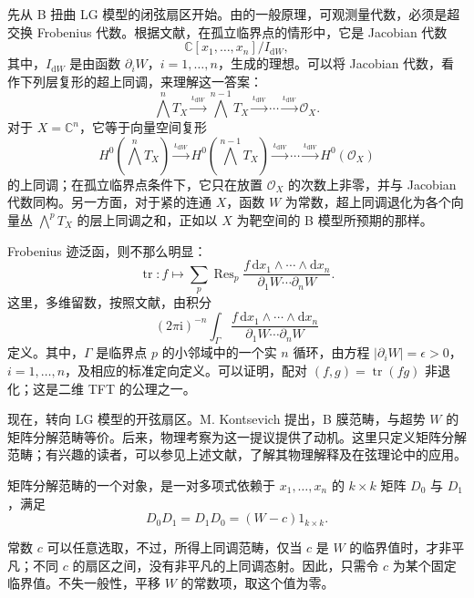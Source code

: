 先从 B 扭曲 LG 模型的闭弦扇区开始。由的一般原理，可观测量代数，必须是超交换 Frobenius 代数。根据文献，在孤立临界点的情形中，它是 Jacobian 代数
\[
\mathbb{C}[x_1,\ldots,x_n]/I_{\mathrm{d}W},
\]
其中，$I_{\mathrm{d}W}$ 是由函数 $\partial_iW$，$i=1,\ldots,n$，生成的理想。可以将 Jacobian 代数，看作下列层复形的超上同调，来理解这一答案：
\[
\bigwedge^nT_X\xrightarrow{\iota_{\mathrm{d}W}}
\bigwedge^{n-1}T_X\xrightarrow{\iota_{\mathrm{d}W}}
\cdots\xrightarrow{\iota_{\mathrm{d}W}}\mathcal{O}_X.
\]
对于 $X=\mathbb{C}^n$，它等于向量空间复形
\[
H^0(\textstyle\bigwedge^nT_X)\xrightarrow{\iota_{\mathrm{d}W}}
H^0(\textstyle\bigwedge^{n-1}T_X)\xrightarrow{\iota_{\mathrm{d}W}}
\cdots\xrightarrow{\iota_{\mathrm{d}W}}H^0(\mathcal{O}_X)
\]
的上同调；在孤立临界点条件下，它只在放置 $\mathcal{O}_X$ 的次数上非零，并与 Jacobian 代数同构。另一方面，对于紧的连通 $X$，函数 $W$ 为常数，超上同调退化为各个向量丛 $\bigwedge^pT_X$ 的层上同调之和，正如以 $X$ 为靶空间的 B 模型所预期的那样。

Frobenius 迹泛函，则不那么明显：
\[
\operatorname{tr}\colon f\longmapsto
\sum_p\operatorname{Res}_p
\frac{f\,\mathrm{d}x_1\wedge\cdots\wedge\mathrm{d}x_n}
{\partial_1W\cdots\partial_nW}.
\]
这里，多维留数，按照文献，由积分
\[
(2\pi\mathrm{i})^{-n}\int_\Gamma
\frac{f\,\mathrm{d}x_1\wedge\cdots\wedge\mathrm{d}x_n}
{\partial_1W\cdots\partial_nW}
\]
定义。其中，$\Gamma$ 是临界点 $p$ 的小邻域中的一个实 $n$ 循环，由方程 $|\partial_iW|=\epsilon>0$，$i=1,\ldots,n$，及相应的标准定向定义。可以证明，配对 $(f,g)=\operatorname{tr}(fg)$ 非退化；这是二维 TFT 的公理之一。

现在，转向 LG 模型的开弦扇区。M. Kontsevich 提出，B 膜范畴，与超势 $W$ 的矩阵分解范畴等价。后来，物理考察为这一提议提供了动机。这里只定义矩阵分解范畴；有兴趣的读者，可以参见上述文献，了解其物理解释及在弦理论中的应用。

\begin{definition*}\label{def:3.matrix-factorization}
矩阵分解范畴的一个对象，是一对多项式依赖于 $x_1,\ldots,x_n$ 的 $k\times k$ 矩阵 $D_0$ 与 $D_1$，满足
\[
D_0D_1=D_1D_0=(W-c)1_{k\times k}.
\]
\end{definition*}
常数 $c$ 可以任意选取，不过，所得上同调范畴，仅当 $c$ 是 $W$ 的临界值时，才非平凡；不同 $c$ 的扇区之间，没有非平凡的上同调态射。因此，只需令 $c$ 为某个固定临界值。不失一般性，平移 $W$ 的常数项，取这个值为零。

